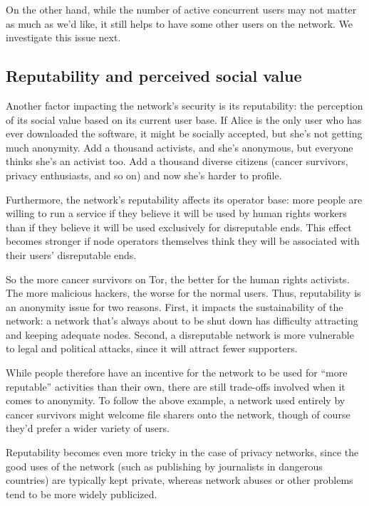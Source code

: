 \documentclass{llncs}
\begin{document}
On the other hand, while the number of active concurrent users may not
matter as much as we'd like, it still helps to have some other users
on the network. We investigate this issue next.

\subsection{Reputability and perceived social value}
Another factor impacting the network's security is its reputability:
the perception of its social value based on its current user base. If Alice is
the only user who has ever downloaded the software, it might be socially
accepted, but she's not getting much anonymity. Add a thousand
activists, and she's anonymous, but everyone thinks she's an activist too.
Add a thousand
diverse citizens (cancer survivors, privacy enthusiasts, and so on)
and now she's harder to profile.

Furthermore, the network's reputability affects its operator base: more people
are willing to run a service if they believe it will be used by human rights
workers than if they believe it will be used exclusively for disreputable
ends.  This effect becomes stronger if node operators themselves think they
will be associated with their users' disreputable ends.

So the more cancer survivors on Tor, the better for the human rights
activists. The more malicious hackers, the worse for the normal users. Thus,
reputability is an anonymity issue for two reasons. First, it impacts
the sustainability of the network: a network that's always about to be
shut down has difficulty attracting and keeping adequate nodes.
Second, a disreputable network is more vulnerable to legal and
political attacks, since it will attract fewer supporters.

While people therefore have an incentive for the network to be used for
``more reputable'' activities than their own, there are still trade-offs
involved when it comes to anonymity. To follow the above example, a
network used entirely by cancer survivors might welcome file sharers
onto the network, though of course they'd prefer a wider
variety of users.

Reputability becomes even more tricky in the case of privacy networks,
since the good uses of the network (such as publishing by journalists in
dangerous countries) are typically kept private, whereas network abuses
or other problems tend to be more widely publicized.
\end{document}
